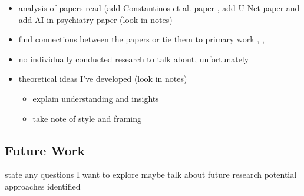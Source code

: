 \documentclass{article}
\begin{document}
\begin{itemize}
    \item analysis of papers read (add Constantinos et al. paper \cite{A-Situation-Awareness-Perspective-on-Human-AI-Interaction},  add U-Net paper \cite{ronneberger2015unetconvolutionalnetworksbiomedical} and add AI in psychiatry paper \cite{Your-Robot-Therapist-Will-See-You-Now} (look in notes)
    \item find connections between the papers or tie them to primary work \cite{A-Situation-Awareness-Perspective-on-Human-AI-Interaction}, \cite{JIANG2024100078}, \cite{shao2024exploring}
    \item no individually conducted research to talk about, unfortunately
    \item theoretical ideas I've developed (look in notes)
    \begin{itemize}
        \item explain understanding and insights
        \item take note of style and framing
    \end{itemize}
\end{itemize}

\begin{center}
    \section*{Future Work}
\end{center}

state any questions I want to explore 
maybe talk about future research 
potential approaches identified 

\begin{center}
    
\end{center}
\end{document}
